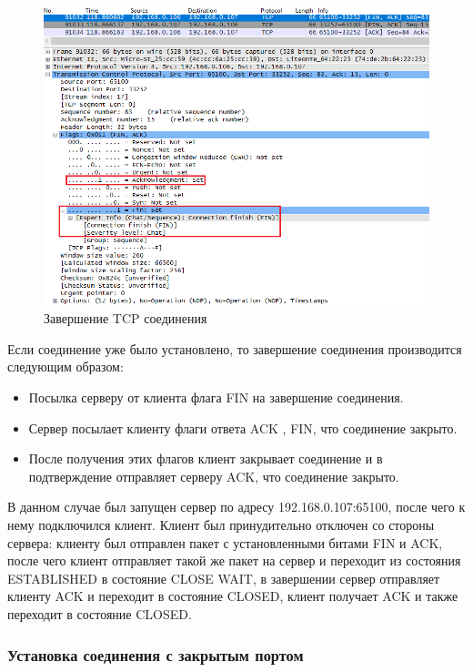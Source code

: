 \documentclass[14pt,a4paper,report]{report}
\begin{document}
\begin{figure}[h!]
	\centering
	\includegraphics[scale = 0.70]{images/tcp5.png}
	
	\caption{Завершение TCP соединения}
	\label{image:19}
\end{figure}

Если соединение уже было установлено, то завершение соединения производится следующим образом:

\begin{itemize}
	\item Посылка серверу от клиента флага FIN на завершение соединения.
	\item Сервер посылает клиенту флаги ответа ACK , FIN, что соединение закрыто.
	\item После получения этих флагов клиент закрывает соединение и в подтверждение отправляет серверу ACK, что соединение закрыто.
\end{itemize}

В данном случае был запущен сервер по адресу 192.168.0.107:65100, после чего к нему подключился клиент. Клиент был принудительно отключен со стороны сервера: клиенту был отправлен пакет с установленными битами FIN и ACK, после чего клиент отправляет такой же пакет на сервер и переходит из состояния ESTABLISHED в состояние CLOSE WAIT, в завершении сервер отправляет клиенту ACK и переходит в состояние CLOSED, клиент получает ACK и также переходит в состояние CLOSED.

\clearpage

\subsubsection{Установка соединения с закрытым портом}
\end{document}
